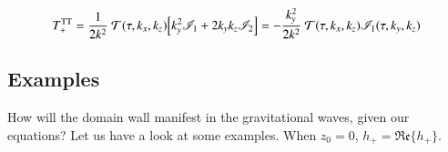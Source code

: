         \begin{equation}
            T^{\mathrm{TT}}_{+} = \frac{1}{2k^2} \mathcal{T}(\tau, k_x, k_z) \bclosed{ k_y^2 \mathscr{I}_1 + 2k_y k_z \mathscr{I}_2 }  = - \frac{k_y^2}{2k^2} \mathcal{T}(\tau, k_x, k_z) \mathscr{I}_1(\tau, k_y,k_z)
        \end{equation}


    



        


    

    
    

    


    

   
    



\subsection{Examples}
        How will the domain wall manifest in the gravitational waves, given our equations? Let us have a look at some examples. When $z_0=0$, $h_+= \mathfrak{Re}\{h_+ \}$. 



